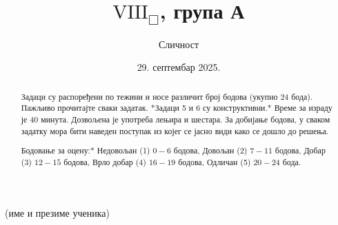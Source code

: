 \documentclass[10pt,a5paper,addpoints,answers]{exam}
\title{$\mathrm{VIII}_\Box$, група А}
\author{Сличност}
\date{29. септембар 2025.}
\begin{document}
\maketitle
\thispagestyle{headandfoot}

\begin{center} \small
 \hrulefill \par (име и презиме ученика)
\end{center}

\begin{abstract}
Задаци су распоређени по тежини и носе различит број бодова (укупно 24 бода). Пажљиво прочитајте сваки задатак. *Задаци 5 и 6 су конструктивни.* Време за израду је 40 минута. Дозвољена је употреба лењира и шестара.
За добијање бодова, у сваком задатку мора бити наведен поступак из којег се јасно види како се дошло до решења.

\medskip
\noindent *Бодовање за оцену:* Недовољан (1) $0 - 6$ бодова, Довољан (2) $7 - 11$ бодова, Добар (3) $12 - 15$ бодова, Врло добар (4) $16 - 19$ бодова, Одличан (5) $20 - 24$ бода.
\end{abstract}

\noindent \gradetable[h]
\end{document}
